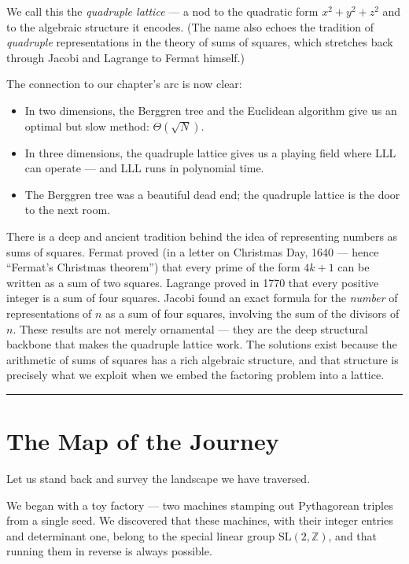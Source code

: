 We call this the \emph{quadruple lattice} --- a nod to the quadratic form \(x^2 + y^2 + z^2\) and to the algebraic structure it encodes. (The name also echoes the tradition of \emph{quadruple} representations in the theory of sums of squares, which stretches back through Jacobi and Lagrange to Fermat himself.)

The connection to our chapter's arc is now clear:

\begin{itemize}
\tightlist
\item
  In two dimensions, the Berggren tree and the Euclidean algorithm give us an optimal but slow method: \(\Theta(\sqrt{N})\).
\item
  In three dimensions, the quadruple lattice gives us a playing field where LLL can operate --- and LLL runs in polynomial time.
\item
  The Berggren tree was a beautiful dead end; the quadruple lattice is the door to the next room.
\end{itemize}

There is a deep and ancient tradition behind the idea of representing numbers as sums of squares. Fermat proved (in a letter on Christmas Day, 1640 --- hence ``Fermat's Christmas theorem'') that every prime of the form \(4k + 1\) can be written as a sum of two squares. Lagrange proved in 1770 that every positive integer is a sum of four squares. Jacobi found an exact formula for the \emph{number} of representations of \(n\) as a sum of four squares, involving the sum of the divisors of \(n\). These results are not merely ornamental --- they are the deep structural backbone that makes the quadruple lattice work. The solutions exist because the arithmetic of sums of squares has a rich algebraic structure, and that structure is precisely what we exploit when we embed the factoring problem into a lattice.

\bigskip\noindent\rule{\linewidth}{0.4pt}\bigskip

\section{The Map of the Journey}
Let us stand back and survey the landscape we have traversed.

We began with a toy factory --- two machines stamping out Pythagorean triples from a single seed. We discovered that these machines, with their integer entries and determinant one, belong to the special linear group \(\mathrm{SL}(2, \mathbb{Z})\), and that running them in reverse is always possible.

